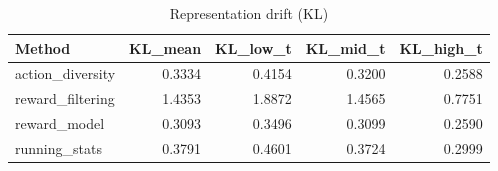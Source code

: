 \begin{table}[htbp]
\centering
\caption{Representation drift (KL)}
\label{tab:repr-drift}
\begin{tabular}{lrrrr}
\toprule
\textbf{Method} & \textbf{KL\_mean} & \textbf{KL\_low\_t} & \textbf{KL\_mid\_t} & \textbf{KL\_high\_t} \\
\midrule
action\_diversity & 0.3334 & 0.4154 & 0.3200 & 0.2588 \\
reward\_filtering & 1.4353 & 1.8872 & 1.4565 & 0.7751 \\
reward\_model & 0.3093 & 0.3496 & 0.3099 & 0.2590 \\
running\_stats & 0.3791 & 0.4601 & 0.3724 & 0.2999 \\
\bottomrule
\end{tabular}
\end{table}